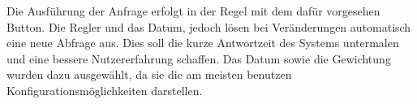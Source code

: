 Die Ausführung der Anfrage erfolgt in der Regel mit dem dafür vorgesehen Button. Die Regler und das Datum, jedoch lösen bei Veränderungen automatisch eine neue Abfrage aus. Dies soll die kurze Antwortzeit des Systems untermalen und eine bessere Nutzererfahrung schaffen. Das Datum sowie die Gewichtung wurden dazu ausgewählt, da sie die am meisten benutzen Konfigurationsmöglichkeiten darstellen.

